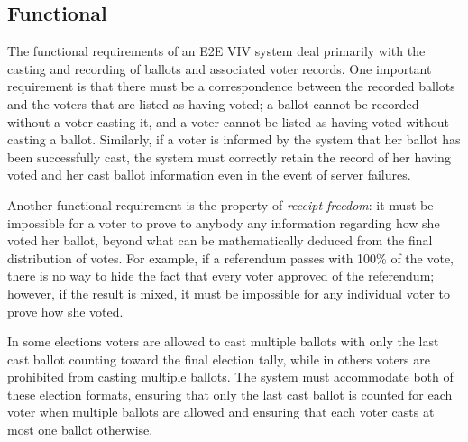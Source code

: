 \subsection{Functional} 
The functional requirements of an E2E VIV system deal primarily with
the casting and recording of ballots and associated voter records. One
important requirement is that there must be a correspondence between
the recorded ballots and the voters that are listed as having voted; a
ballot cannot be recorded without a voter casting it, and a voter
cannot be listed as having voted without casting a ballot. Similarly,
if a voter is informed by the system that her ballot has been
successfully cast, the system must correctly retain the record of her
having voted and her cast ballot information even in the event of
server failures.

Another functional requirement is the property of \emph{receipt
  freedom}: it must be impossible for a voter to prove to anybody any
information regarding how she voted her ballot, beyond what can be
mathematically deduced from the final distribution of votes. For
example, if a referendum passes with 100\% of the vote, there is no
way to hide the fact that every voter approved of the referendum;
however, if the result is mixed, it must be impossible for any
individual voter to prove how she voted. 

In some elections voters are allowed to cast multiple ballots with
only the last cast ballot counting toward the final election tally,
while in others voters are prohibited from casting multiple
ballots. The system must accommodate both of these election formats,
ensuring that only the last cast ballot is counted for each voter when
multiple ballots are allowed and ensuring that each voter casts at
most one ballot otherwise.

